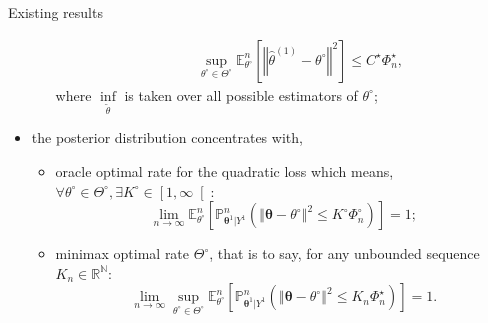 \documentclass[final,hyperref={pdfpagelabels=false}]{beamer}
\begin{document}
\begin{frame}[t]
\begin{columns}[t]
\begin{column}{.30\textwidth}
\begin{block}{\rule{0pt}{2.5ex} Existing results}
\begin{itemize}
\begin{itemize}
\begin{alignat*}{2}
& && \sup\limits_{\theta^{\circ} \in \Theta^{\circ}} \mathbb{E}_{\theta^{\circ}}^{n}\left[\left\Vert \widehat{\theta}^{\left(1\right)} - \theta^{\circ} \right\Vert^{2}\right] \leq C^{\star} \Phi_{n}^{\star},
\end{alignat*}
where $\inf\limits_{\tilde{\theta}}$ is taken over all possible estimators of $\theta^{\circ}$;
	\end{itemize}
	\item the posterior distribution \textcolor{red!90!black}{concentrates with,}
	\begin{itemize}
		\item \textcolor{red!90!black}{oracle optimal rate} for the quadratic loss which means, $\forall \theta^{\circ} \in \Theta^{\circ}, \exists K^{\circ} \in \left[ 1, \infty \right[ :$
\[\lim\limits_{n \rightarrow \infty} \mathbb{E}_{\theta^{\circ}}^{n}\left[\mathbb{P}_{\boldsymbol{\theta}^{1}\vert Y^{1}}^{n}\left(\left\Vert \boldsymbol{\theta} - \theta^{\circ} \right\Vert^{2} \leq K^{\circ} \Phi_{n}^{\circ}\right)\right] = 1;\]
		\item \textcolor{red!90!black}{minimax optimal rate} $\Theta^{\circ}$, that is to say, for any unbounded sequence $K_{n} \in \mathbb{R}^{\mathbb{N}} :$
\[\lim\limits_{n \rightarrow \infty} \sup\limits_{\theta^{\circ} \in \Theta^{\circ}}  \mathbb{E}_{\theta^{\circ}}^{n}\left[\mathbb{P}_{\boldsymbol{\theta}^{1}\vert Y^{1}}^{n}\left(\left\Vert \boldsymbol{\theta} - \theta^{\circ} \right\Vert^{2} \leq K_{n} \Phi_{n}^{\star}\right)\right] = 1.\]
	\end{itemize}


\end{itemize}
\end{block}
\end{column}
\end{columns}
\end{frame}
\end{document}
